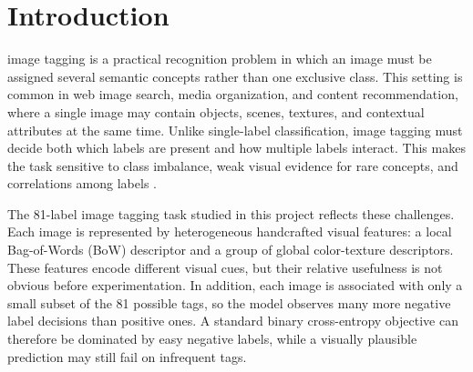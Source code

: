 \documentclass[10pt,journal,compsoc]{IEEEtran}
\begin{document}
\section{Introduction}
\fi
\label{sec:introduction}




% 
% 
% 
% 
 image tagging is a practical recognition problem in
which an image must be assigned several semantic concepts rather than one
exclusive class. This setting is common in web image search, media
organization, and content recommendation, where a single image may contain
objects, scenes, textures, and contextual attributes at the same time. Unlike
single-label classification, image tagging must decide both which labels are
present and how multiple labels interact. This makes the task sensitive to
class imbalance, weak visual evidence for rare concepts, and correlations
among labels \cite{zhang2005mlknn,elisseeff2001kernel,lanchantin2021general}.

The 81-label image tagging task studied in this project reflects these
challenges. Each image is represented by heterogeneous handcrafted visual
features: a local Bag-of-Words (BoW) descriptor and a group of global
color-texture descriptors. These features encode different visual cues, but
their relative usefulness is not obvious before experimentation. In addition,
each image is associated with only a small subset of the 81 possible tags, so
the model observes many more negative label decisions than positive ones. A
standard binary cross-entropy objective can therefore be dominated by easy
negative labels, while a visually plausible prediction may still fail on
infrequent tags.
\end{document}
